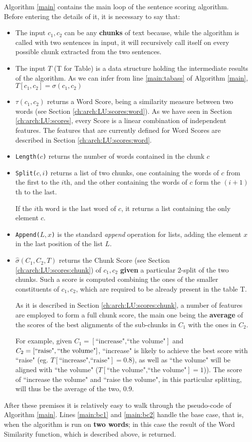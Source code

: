Algorithm \ref{main} contains the main loop of the sentence scoring algorithm. Before entering the details of it, it is necessary to say that:
\begin{itemize}
\item The input $c_1,c_2$ can be any \textbf{chunks} of text because, while the algorithm is called with two sentences in input, it will recursively call itself on every possible chunk extracted from the two sentences.
\item The input $T$ (T for Table) is a data structure holding the intermediate results of the algorithm. As we can infer from line \ref{main:tabass} of Algorithm \ref{main}, $T[c_1,c_2]=\sigma(c_1,c_2)$
\item $\tau(c_1,c_2)$ returns a Word Score, being a similarity measure between two words (see Section \ref{ch:arch:LU:scores:word}). As we have seen in Section \ref{ch:arch:LU:scores}, every Score is a linear combination of independent features. The features that are currently defined for Word Scores are described in Section \ref{ch:arch:LU:scores:word}.
\item \texttt{Length($c$)} returns the number of words contained in the chunk $c$
\item \texttt{Split($c,i$)} returns a list of two chunks, one containing the words of $c$ from the first to the $i$th, and the other containing the words of $c$ form the $(i+1)$th to the last.

If the $i$th word is the last word of $c$, it returns a list containing the only element $c$.
\item \texttt{Append($L,x$)} is the standard \emph{append} operation for lists, adding the element $x$ in the last position of the list $L$.
\item $\hat{\sigma}(C_1,C_2,T)$ returns the Chunk Score (see Section \ref{ch:arch:LU:scores:chunk}) of $c_1,c_2$ \textbf{given} a particular 2-split of the two chunks. Such a score is computed combining the ones of the smaller constituents of $c_1,c_2$, which are required to be already present in the table T.

As it is described in Section \ref{ch:arch:LU:scores:chunk}, a number of features are employed to form a full chunk score, the main one being the \textbf{average} of the scores of the best alignments of the sub-chunks in $C_1$ with the ones in $C_2$.

For example, given $C_1=[\text{``increase",``the volume"}]$ and $C_2=[\text{``raise"},\\ \text{``the volume"}]$, ``increase" is likely to achieve the best score with ``raise" (eg. $T[\text{``increase",``raise"}]=0.8$), as well as ``the volume" will be aligned with ``the volume" ($T[\text{``the volume",``the volume"}]=1$)). The score of ``increase the volume" and ``raise the volume", in this particular splitting, will thus be the average of the two, 0.9.
\end{itemize}
After these premises it is relatively easy to walk through the pseudo-code of Algorithm \ref{main}. Lines \ref{main:bc1} and \ref{main:bc2} handle the base case, that is, when the algorithm is run on \textbf{two words}; in this case the result of the Word Similarity function, which is described above, is returned.


